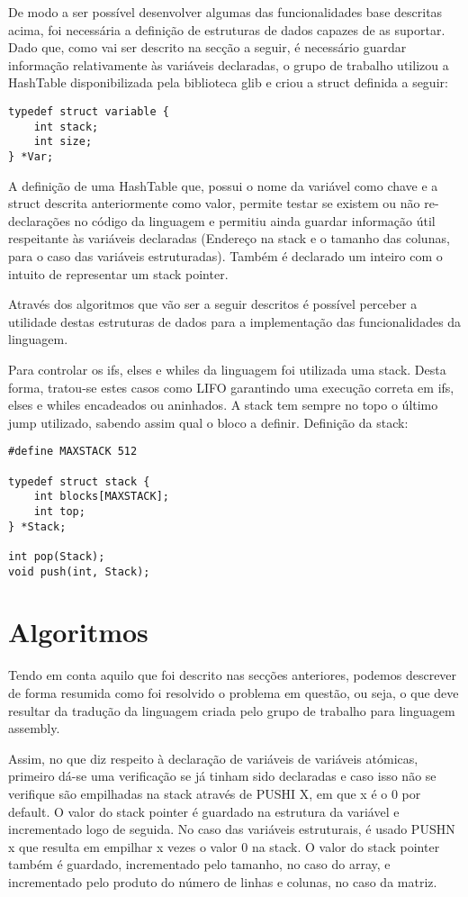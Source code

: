 \documentclass{report}
\begin{document}
De modo a ser possível desenvolver algumas das funcionalidades base descritas acima, foi necessária a definição de estruturas de dados capazes de as suportar. Dado que, como vai ser descrito na secção a seguir, é necessário guardar informação relativamente às variáveis declaradas, o grupo de trabalho utilizou a HashTable disponibilizada pela biblioteca glib e criou a struct definida a seguir: 

\begin{lstlisting}
typedef struct variable {
    int stack;
    int size;
} *Var;
\end{lstlisting}

A definição de uma HashTable que, possui o nome da variável como chave e a struct descrita anteriormente como valor, permite testar se existem ou não re-declarações no código da linguagem e permitiu ainda guardar informação útil respeitante às variáveis declaradas (Endereço na stack e o tamanho das colunas, para o caso das variáveis estruturadas). Também é declarado um inteiro com o intuito de  representar um stack pointer.

Através dos algoritmos que vão ser a seguir descritos é possível perceber a utilidade destas estruturas de dados para a implementação das funcionalidades da linguagem. 

Para controlar os ifs, elses e whiles da linguagem foi utilizada uma stack. Desta forma, tratou-se estes casos como LIFO garantindo 
uma execução correta em ifs, elses e whiles encadeados ou aninhados. A stack tem sempre no topo o último jump utilizado, sabendo assim
qual o bloco a definir. Definição da stack:

\begin{lstlisting}
#define MAXSTACK 512

typedef struct stack {
    int blocks[MAXSTACK];
    int top;
} *Stack;

int pop(Stack);
void push(int, Stack);
\end{lstlisting}


\section{Algoritmos}

Tendo em conta aquilo que foi descrito nas secções anteriores, podemos descrever de forma resumida como foi resolvido o problema em questão, ou seja, o que deve resultar da tradução da linguagem criada pelo  grupo de trabalho para linguagem assembly.  

Assim, no que diz respeito à declaração de variáveis de variáveis atómicas, primeiro dá-se uma verificação se já tinham sido declaradas e caso isso não se verifique são empilhadas na stack através de PUSHI X, em que x é o 0 por default. O valor do stack pointer é guardado na estrutura da variável e incrementado logo de seguida. No caso das variáveis estruturais, é usado PUSHN x que resulta em empilhar x vezes o valor 0 na stack.  O valor do stack pointer também é guardado, incrementado pelo tamanho, no caso do array, e incrementado pelo produto do número de linhas e colunas, no caso da matriz. 
\end{document}
